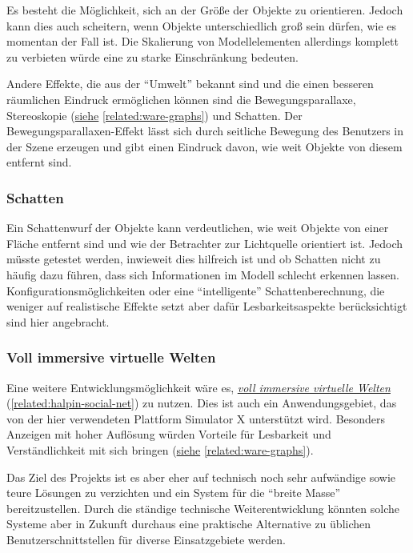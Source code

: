 \documentclass[a4paper,10pt]{sphinxmanual}
\begin{document}
Es besteht die Möglichkeit, sich an der Größe der Objekte zu orientieren. Jedoch kann dies auch scheitern, wenn Objekte unterschiedlich groß sein dürfen, wie es momentan der Fall ist.
Die Skalierung von Modellelementen allerdings komplett zu verbieten würde eine zu starke Einschränkung bedeuten.

Andere Effekte, die aus der "`Umwelt"' bekannt sind und die einen besseren räumlichen Eindruck ermöglichen können sind die Bewegungsparallaxe, Stereoskopie ({\hyperref[related:ware-graphs]{siehe}} \autoref*{related:ware-graphs}) und Schatten.
Der Bewegungsparallaxen-Effekt lässt sich durch seitliche Bewegung des Benutzers in der Szene erzeugen und gibt einen Eindruck davon, wie weit Objekte von diesem entfernt sind.


\subsubsection{Schatten}
\label{visualisierung:schatten}
Ein Schattenwurf der Objekte kann verdeutlichen, wie weit Objekte von einer Fläche entfernt sind und wie der Betrachter zur Lichtquelle orientiert ist.
Jedoch müsste getestet werden, inwieweit dies hilfreich ist und ob Schatten nicht zu häufig dazu führen, dass sich Informationen im Modell schlecht erkennen lassen.
Konfigurationsmöglichkeiten oder eine "`intelligente"' Schattenberechnung, die weniger auf realistische Effekte setzt aber dafür Lesbarkeitsaspekte berücksichtigt sind hier angebracht.


\subsubsection{Voll immersive virtuelle Welten}
\label{visualisierung:voll-immersive-virtuelle-welten}
Eine weitere Entwicklungsmöglichkeit wäre es, {\hyperref[related:halpin-social-net]{\emph{voll immersive virtuelle Welten}}} (\autoref*{related:halpin-social-net}) zu nutzen.
Dies ist auch ein Anwendungsgebiet, das von der hier verwendeten Plattform Simulator X unterstützt wird.
Besonders Anzeigen mit hoher Auflösung würden Vorteile für Lesbarkeit und Verständlichkeit mit sich bringen ({\hyperref[related:ware-graphs]{siehe}} \autoref*{related:ware-graphs}).

Das Ziel des Projekts ist es aber eher auf technisch noch sehr aufwändige sowie teure Lösungen zu verzichten und ein System für die "`breite Masse"' bereitzustellen.
Durch die ständige technische Weiterentwicklung könnten solche Systeme aber in Zukunft durchaus eine praktische Alternative zu üblichen Benutzerschnittstellen für diverse Einsatzgebiete werden.
\end{document}
